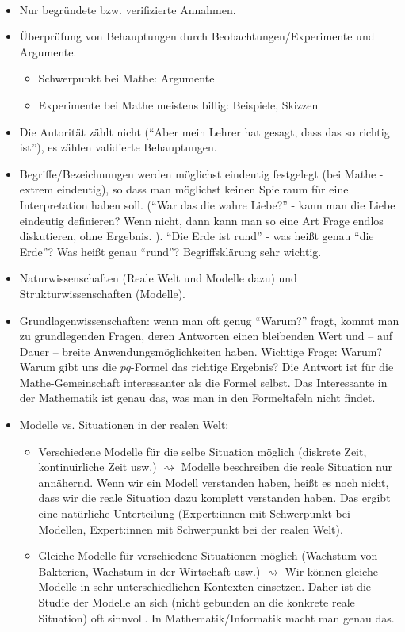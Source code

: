 \begin{bem}\ 
\begin{itemize}
	\item Nur begründete bzw. verifizierte Annahmen. 
	\item Überprüfung von Behauptungen durch Beobachtungen/Experimente und Argumente. 
	\begin{itemize}
		\item Schwerpunkt bei Mathe: Argumente 
		\item Experimente bei Mathe meistens billig: Beispiele, Skizzen 
	\end{itemize} 
	\item Die Autorität zählt nicht (``Aber mein Lehrer hat gesagt, dass das so richtig ist''), es zählen validierte Behauptungen. 
	\item Begriffe/Bezeichnungen werden möglichst eindeutig festgelegt (bei Mathe - extrem eindeutig),  so dass man möglichst keinen Spielraum für eine Interpretation haben soll. (``War das die wahre Liebe?'' - kann man die Liebe eindeutig definieren? Wenn nicht, dann kann man so eine Art Frage endlos diskutieren, ohne Ergebnis. ). ``Die Erde ist rund'' - was heißt genau ``die Erde''? Was heißt genau ``rund''? Begriffsklärung sehr wichtig. 
	\item Naturwissenschaften (Reale Welt und Modelle dazu) und  Strukturwissenschaften (Modelle). 
	\item Grundlagenwissenschaften: wenn man oft genug ``Warum?'' fragt, kommt man zu grundlegenden Fragen, deren Antworten einen bleibenden Wert und -- auf Dauer -- breite Anwendungsmöglichkeiten haben. Wichtige Frage: Warum? Warum gibt uns die $pq$-Formel das richtige Ergebnis? Die Antwort ist für die Mathe-Gemeinschaft interessanter als die Formel selbst. Das Interessante in der Mathematik ist genau das, was man in den Formeltafeln nicht findet. 
	\item Modelle vs. Situationen in der realen Welt: 
	\begin{itemize}
			\item Verschiedene Modelle für die selbe Situation möglich (diskrete Zeit, kontinuirliche Zeit usw.) $\rightsquigarrow$ Modelle beschreiben die reale Situation nur annähernd. Wenn wir ein Modell verstanden haben, heißt es noch nicht, dass wir die reale Situation dazu komplett verstanden haben. Das ergibt eine natürliche Unterteilung (Expert:innen mit Schwerpunkt bei Modellen, Expert:innen mit Schwerpunkt bei der realen Welt). 
			\item Gleiche Modelle für verschiedene Situationen möglich (Wachstum von Bakterien, Wachstum in der Wirtschaft usw.) $\rightsquigarrow$ Wir können gleiche Modelle in sehr unterschiedlichen Kontexten einsetzen. Daher ist die Studie der Modelle an sich (nicht gebunden an die konkrete reale Situation) oft sinnvoll. In Mathematik/Informatik macht man genau das. 
	\end{itemize} 
\end{itemize} 
\end{bem}


